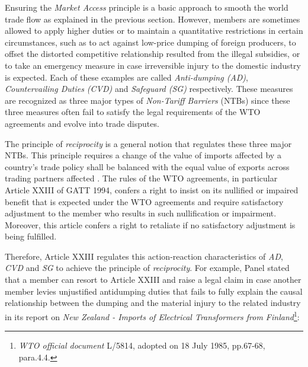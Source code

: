 
 
Ensuring the \textit{Market Access} principle
is a basic approach to smooth the world trade flow as explained in the previous section. %
However, members are sometimes allowed to apply higher duties or to maintain a quantitative restrictions in certain circumstances, such as
to act against low-price dumping of foreign producers, to offset the distorted competitive relationship resulted from the illegal subsidies, or to take an emergency measure in case irreversible injury to the domestic industry is expected. Each of these examples
are called \textit{Anti-dumping (AD)}, \textit{Countervailing Duties (CVD)} and \textit{Safeguard (SG)} respectively. These measures are recognized as
three major types of \textit{Non-Tariff Barriers} (NTBs) %
since these three measures often fail to satisfy the legal requirements of the WTO agreements and evolve into trade disputes.
 
The principle of \textit{reciprocity} is a general notion that regulates these three major NTBs.
This principle requires a change of the value of imports affected by a country's trade policy
shall be balanced with the equal value of exports across trading partners affected \citep{bagwell1999}.
The rules of the WTO agreements, in particular Article XXIII of GATT 1994,
confers a right to insist on its nullified or impaired benefit that is expected under the WTO agreements and require satisfactory adjustment to the member
who results in such nullification or impairment. Moreover, this article confers a right to retaliate if no satisfactory adjustment is being fulfilled.
 
Therefore, Article XXIII regulates this action-reaction characteristics of \textit{AD}, \textit{CVD} and \textit{SG} to achieve the principle of \textit{reciprocity}. %
For example, Panel stated that a member can resort to Article XXIII and raise a legal claim in case another member levies unjustified antidumping duties that fails to fully explain the causal relationship between the dumping and the material injury to the related industry in its report on \textit{New Zealand - Imports of Electrical Transformers from Finland}\footnote{\textit{WTO official document} L/5814, adopted on 18 July 1985, pp.67-68, para.4.4.}:
 
